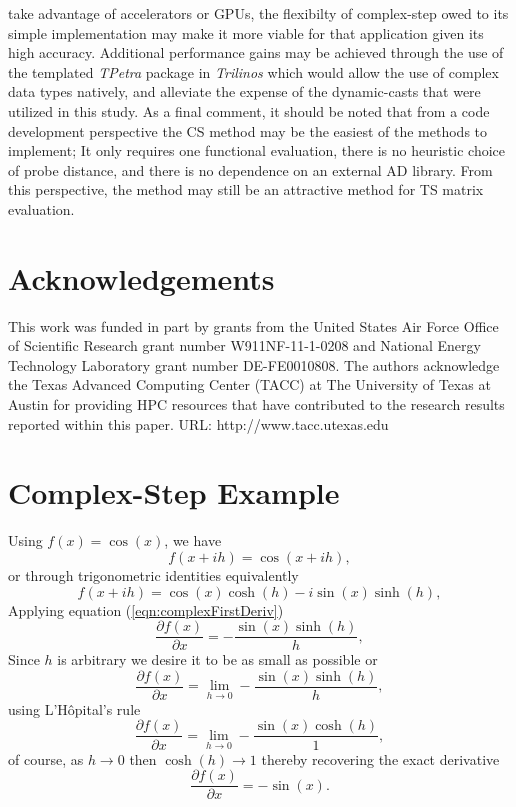 \documentclass[preprint,12pt]{elsarticle}
\begin{document}
take advantage of accelerators or GPUs, the flexibilty of complex-step owed to
its simple implementation may make it more viable for that application given
its high accuracy. Additional performance gains may be achieved through the use
of the templated \emph{TPetra} package in \emph{Trilinos} which would allow the
use of complex data types natively, and alleviate the expense of the
dynamic-casts that were utilized in this study.  As a final comment, it should
be noted that from a code development perspective the CS method may be the
easiest of the methods to implement; It only requires one functional
evaluation, there is no heuristic choice of probe distance, and there is no
dependence on an external AD library.  From this perspective, the method may
still be an attractive method for TS matrix evaluation.



\section{Acknowledgements}
\label{sec:ack}
This work was funded in part by grants from the United States Air Force Office of Scientific Research grant number W911NF-11-1-0208 and National Energy Technology Laboratory grant number DE-FE0010808. The authors acknowledge the Texas Advanced Computing Center (TACC) at The University of Texas at Austin for providing HPC resources that have contributed to the research results reported within this paper. URL: http://www.tacc.utexas.edu





\appendix
\renewcommand*{\thesection}{\Alph{section}}
%
\section{Complex-Step Example}
\label{sec:appendixA}
%
Using $f(x) = \cos(x)$, we have
%
\[
f (x + i h) = \cos(x + i h),
\]
%
or through trigonometric identities equivalently
%
\[
f(x + i h) = \cos(x) \cosh(h) - i \sin(x) \sinh(h),
\]
%
Applying equation (\ref{eqn:complexFirstDeriv})
\[
\frac{\partial f(x)}{\partial x} = - \frac{\sin(x) \sinh(h)}{h},
\]
Since $h$ is arbitrary we desire it to be as small as possible or
\[
\frac{\partial f(x)}{\partial x} = \lim_{h \to 0} - \frac{\sin(x) \sinh(h)}{h},
\]
using L'H\^opital's rule
\[
\frac{\partial f(x)}{\partial x} = \lim_{h \to 0} - \frac{\sin(x) \cosh(h)}{1},
\]
of course, as $h \to 0$ then $\cosh(h) \to 1$ thereby recovering the exact derivative
\[
\frac{\partial f(x)}{\partial x} =-\sin(x).
\]
\end{document}
